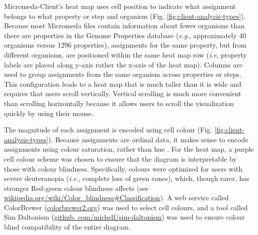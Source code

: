Micromeda-Client's heat map uses cell position to indicate what assignment 
belongs to what property or step and organism (Fig. 
\ref{fig:client-analysis-types}). Because most Micromeda files contain 
information about fewer organisms than there are properties in the Genome 
Properties database (\textit{e}.\textit{g}., approximately 40 organisms versus 
1296 properties), assignments for the same property, but from different 
organisms, are positioned within the same heat map row (\textit{i}.\textit{e}, 
property labels are placed along y-axis rather the x-axis of the heat map). 
Columns are used to group assignments from the same organism across properties 
or steps. This configuration leads to a heat map that is much taller than it is 
wide and requires that users scroll vertically. Vertical scrolling is much more 
convenient than scrolling horizontally because it allows users to scroll the 
visualization quickly by using their mouse.

The magnitude of each assignment is encoded using cell colour (Fig. 
\ref{fig:client-analysis-types}). Because assignments are ordinal data, it makes 
sense to encode assignments using colour saturation, rather than hue 
\cite{munzner2015visualization}. For the heat map, a purple cell colour scheme 
was chosen to ensure that the diagram is interpretable by those with colour 
blindness. Specifically, colours were optimized for users with severe 
deuteranopia (\textit{i}.\textit{e}., complete loss of green cones), which, though rarer, has 
stronger Red-green colour blindness affects (see 
\href{http://wikipedia.org/wiki/Color_blindness#Classification}{wikipedia.org/wiki/Color\_blindness\#Classification}). 
A web service called ColorBrewer 
(\href{http://colorbrewer2.org}{colorbrewer2.org}) was used to select cell 
colours, and a tool called Sim Daltonism 
(\href{http://github.com/michelf/sim-daltonism}{github. 
com/michelf/sim-daltonism}) was used to ensure colour blind compatibility of the 
entire diagram. 

